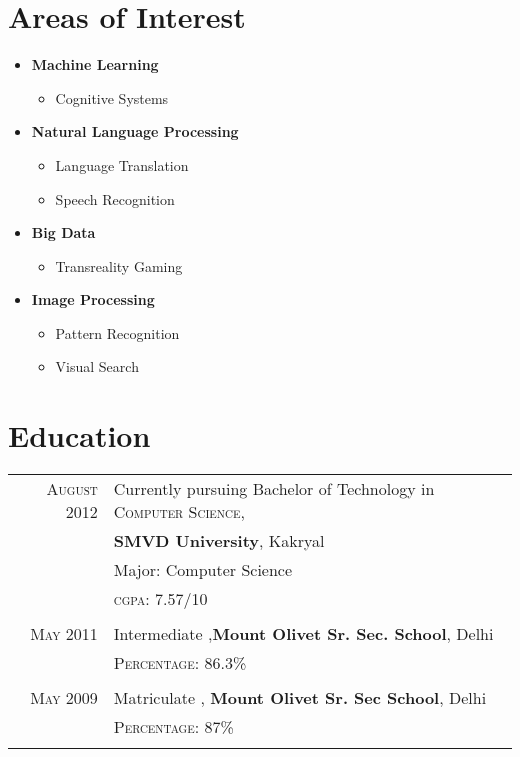 \documentclass[a4paper,10pt]{article}
\begin{document}
\section{Areas of Interest}
\begin{itemize}
  \item {\large\textbf{Machine Learning}}
  \begin{itemize}
    \item Cognitive Systems
  \end{itemize}
  \item {\large\textbf{Natural Language Processing}}
  \begin{itemize}
    \item Language Translation
    \item Speech Recognition
  \end{itemize}
  \item {\large\textbf{Big Data}}
  \begin{itemize}
    \item Transreality Gaming
  \end{itemize}
  \item {\large\textbf{Image Processing}}
  \begin{itemize}
    \item Pattern Recognition
    \item Visual Search
  \end{itemize}
\end{itemize}




\section{Education}
\begin{tabular}{rl}	
 \textsc{August} 2012 & Currently pursuing Bachelor of Technology in \textsc{Computer Science, }\\& \textbf{SMVD University}, Kakryal\\
& Major: Computer Science\\
&\normalsize \textsc{cgpa}: 7.57/10 \\ & \\
\textsc{May} 2011& Intermediate  ,\normalsize\textbf{Mount Olivet Sr. Sec. School}, Delhi\\
&\normalsize \textsc{Percentage}: 86.3\% \\&\\
\textsc{May} 2009& Matriculate , \textbf{Mount Olivet Sr. Sec School}, Delhi\\
&\textsc{Percentage}: 87\% \\&\\
\end{tabular}
\end{document}

